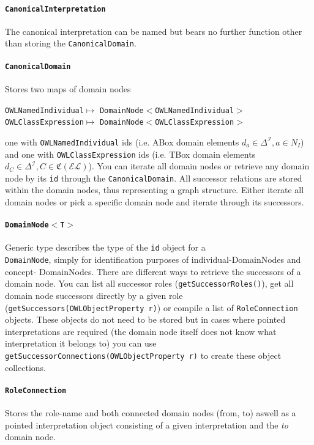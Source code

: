 \documentclass{article}
\newcommand{\EL}{\ensuremath{\mathcal{EL}}}
\newcommand{\C}{\ensuremath{\mathfrak{C}}}
\newcommand{\I}{\ensuremath{\mathcal{I}}}
\begin{document}
\paragraph{\texttt{CanonicalInterpretation}} The canonical interpretation can be
named but bears no further function other than storing the
\texttt{CanonicalDomain}.
\paragraph{\texttt{CanonicalDomain}} Stores two maps of domain nodes
\begin{center}
\texttt{OWLNamedIndividual}$\mapsto$
\texttt{DomainNode$<$OWLNamedIndividual$>$}\\
\texttt{OWLClassExpression}$\mapsto$ \texttt{DomainNode$<$OWLClassExpression$>$}
\end{center}
one with \texttt{OWLNamedIndividual} ids (i.e. ABox domain elements $d_a\in
\Delta^\I, a\in N_I$) and one with \texttt{OWLClassExpression} ids (i.e. TBox
domain elements $d_C\in \Delta^\I, C\in \C(\EL)$). You can iterate all domain
nodes or retrieve any domain node by its \texttt{id} through the
\texttt{CanonicalDomain}. All successor relations are stored within the domain
nodes, thus representing a graph structure. Either iterate all domain nodes or
pick a specific domain node and iterate through its successors.

\paragraph{\texttt{DomainNode$<$T$>$}} Generic type describes the type of the
\texttt{id} object for a\\ \texttt{DomainNode}, simply for identification
purposes of individual-DomainNodes and concept- DomainNodes. There are different
ways to retrieve the successors of a domain node. You can list all successor
roles (\texttt{getSuccessorRoles()}), get all domain node successors directly by
a given role (\texttt{getSuccessors(OWLObjectProperty r)}) or compile a list of
\texttt{RoleConnection} objects. These objects do not need to be stored but in
cases where pointed interpretations are required (the domain node itself does
not know what interpretation it belongs to) you can use\\
\texttt{getSuccessorConnections(OWLObjectProperty r)} to create these object
collections.

\paragraph{\texttt{RoleConnection}} Stores the role-name and both connected
domain nodes (from, to) aswell as a pointed interpretation object consisting of
a given interpretation and the \textit{to} domain node.
\end{document}

